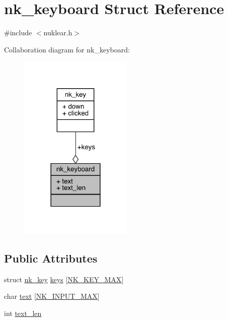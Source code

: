 \hypertarget{structnk__keyboard}{}\section{nk\+\_\+keyboard Struct Reference}
\label{structnk__keyboard}


{\ttfamily \#include $<$nuklear.\+h$>$}



Collaboration diagram for nk\+\_\+keyboard\+:
\nopagebreak
\begin{figure}[H]
\begin{center}
\leavevmode
\includegraphics[width=153pt]{structnk__keyboard__coll__graph}
\end{center}
\end{figure}
\subsection*{Public Attributes}
\begin{DoxyCompactItemize}
\item 
struct \mbox{\hyperlink{structnk__key}{nk\+\_\+key}} \mbox{\hyperlink{structnk__keyboard_a7f4bc6e6c826efeef5ac3ccfe7be2951}{keys}} \mbox{[}\mbox{\hyperlink{nuklear_8h_a167b9acb4687d274e2553658a4a70933a6375e27bbfaa7223347a27dc18be51d3}{N\+K\+\_\+\+K\+E\+Y\+\_\+\+M\+AX}}\mbox{]}
\item 
char \mbox{\hyperlink{structnk__keyboard_a9cdc372561fb571c1feb28837d5fc965}{text}} \mbox{[}\mbox{\hyperlink{nuklear_8h_a6e69058f808cd9f9af5c1b357dfdde57}{N\+K\+\_\+\+I\+N\+P\+U\+T\+\_\+\+M\+AX}}\mbox{]}
\item 
int \mbox{\hyperlink{structnk__keyboard_a17efc7c3577ba4ff1b3eb4a46bc6f082}{text\+\_\+len}}
\end{DoxyCompactItemize}


